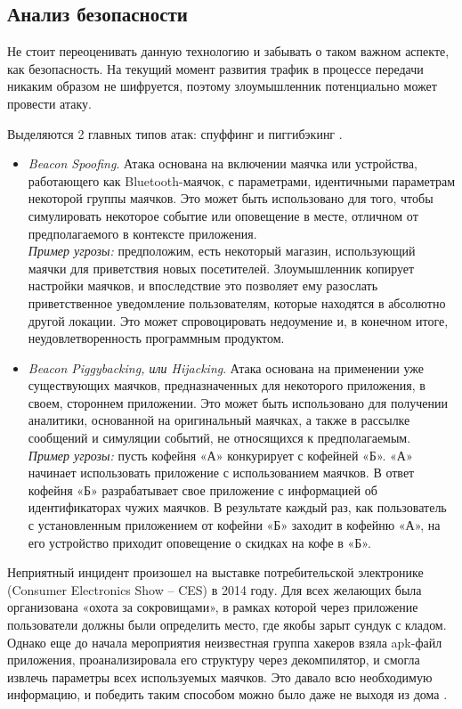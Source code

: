 \subsection{Анализ безопасности}

Не стоит переоценивать данную технологию и забывать о таком важном аспекте, как безопасность. На текущий момент развития трафик в процессе передачи никаким образом не шифруется, поэтому злоумышленник потенциально может провести атаку.

Выделяются 2 главных типов атак: спуффинг и пиггибэкинг \cite{web:SecuritySlides}.

\begin{itemize}
    \item
    \textit{Beacon Spoofing}. Атака основана на включении маячка или устройства, работающего как Bluetooth-маячок, с параметрами, идентичными параметрам некоторой группы маячков. Это может быть использовано для того, чтобы симулировать некоторое событие или оповещение в месте, отличном от предполагаемого в контексте приложения. \\
    \textit{Пример угрозы:} предположим, есть некоторый магазин, использующий маячки для приветствия новых посетителей. Злоумышленник копирует настройки маячков, и впоследствие это позволяет ему разослать приветственное уведомление пользователям, которые находятся в абсолютно другой локации. Это может спровоцировать недоумение и, в конечном итоге, неудовлетворенность программным продуктом.
    \item
    \textit{Beacon Piggybacking, или Hijacking}. Атака основана на применении уже существующих маячков, предназначенных для некоторого приложения, в своем, стороннем приложении. Это может быть использовано для получении аналитики, основанной на оригинальный маячках, а также в рассылке сообщений и симуляции событий, не относящихся к предполагаемым. \\
    \textit{Пример угрозы:} пусть кофейня «А» конкурирует с кофейней «Б». «А» начинает использовать приложение с использованием маячков. В ответ кофейня «Б» разрабатывает свое приложение с информацией об идентификаторах чужих маячков. В результате каждый раз, как пользователь с установленным приложением от кофейни «Б» заходит в кофейню «А», на его устройство приходит оповещение о скидках на кофе в «Б».
\end{itemize}

Неприятный инцидент произошел на выставке потребительской электронике (Consumer Electronics Show – CES) в 2014 году. Для всех желающих была организована «охота за сокровищами», в рамках которой через приложение пользователи должны были определить место, где якобы зарыт сундук с кладом. Однако еще до начала мероприятия неизвестная группа хакеров взяла apk-файл приложения, проанализировала его структуру через декомпилятор, и смогла извлечь параметры всех используемых маячков. Это давало всю необходимую информацию, и победить таким способом можно было даже не выходя из дома \cite{web:ScavengeHunt}.


